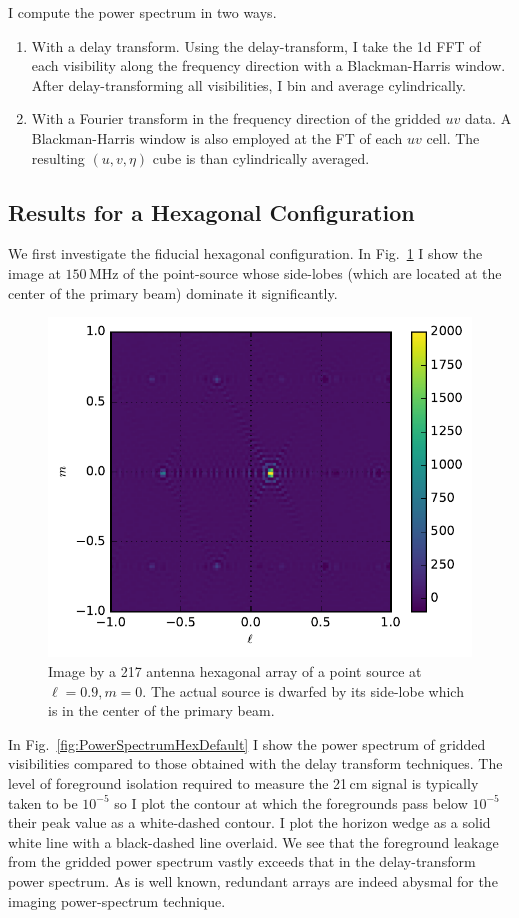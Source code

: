 \documentclass[a4paper,fleqn,usenatbib]{mnras}
\begin{document}
I compute the power spectrum in two ways.
\begin{enumerate}
\item With a delay transform. Using the \citep{Parsons:2012a} delay-transform, I take the 1d FFT of each visibility along the frequency direction with a Blackman-Harris window. After delay-transforming all visibilities, I bin and average cylindrically. 
\item With a Fourier transform in the frequency direction of the gridded $uv$ data. A Blackman-Harris window is also employed at the FT of each $uv$ cell. The resulting $(u,v,\eta)$ cube is than cylindrically averaged.
\end{enumerate}

\subsection{Results for a Hexagonal Configuration}
We first investigate the fiducial hexagonal configuration. In Fig.~\ref{fig:ImageHexDefault} I show the image at $150$\,MHz of the point-source whose side-lobes (which are located at the center of the primary beam) dominate it significantly. 
\begin{figure}
\includegraphics[width=.5\textwidth]{image_offZenith_217Ant_hex_dant_2_dantpos_3.pdf}
\caption{Image by a 217 antenna hexagonal array of a point source at $\ell=0.9,m=0$. The actual source is dwarfed by its side-lobe which is in the center of the primary beam.}
\label{fig:ImageHexDefault}
\end{figure}

In Fig.~\ref{fig:PowerSpectrumHexDefault} I show the power spectrum of gridded visibilities compared to those obtained with the delay transform techniques. The level of foreground isolation required to measure the 21\,cm signal is typically taken to be $10^{-5}$ so I plot the contour at which the foregrounds pass below $10^{-5}$ their peak value as a white-dashed contour. I plot the horizon wedge as a solid white line with a black-dashed line overlaid. We see that the foreground leakage from the gridded power spectrum vastly exceeds that in the delay-transform power spectrum. As is well known, redundant arrays are indeed abysmal for the imaging power-spectrum technique. 
\end{document}
